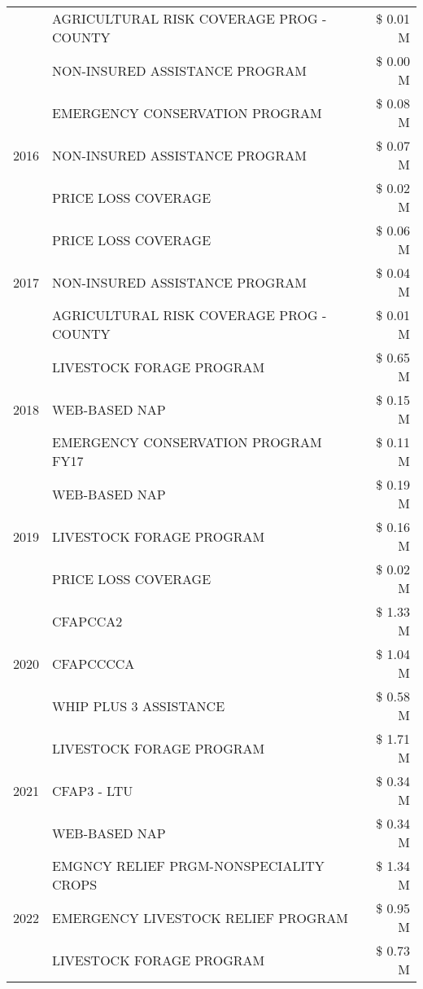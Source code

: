 \begin{tabular}{llr}
 & AGRICULTURAL RISK COVERAGE PROG - COUNTY & \$ 0.01 M \\
 & NON-INSURED ASSISTANCE PROGRAM & \$ 0.00 M \\
\cline{1-3}
\multirow[t]{3}{*}{2016} & EMERGENCY CONSERVATION PROGRAM & \$ 0.08 M \\
 & NON-INSURED ASSISTANCE PROGRAM & \$ 0.07 M \\
 & PRICE LOSS COVERAGE & \$ 0.02 M \\
\cline{1-3}
\multirow[t]{3}{*}{2017} & PRICE LOSS COVERAGE & \$ 0.06 M \\
 & NON-INSURED ASSISTANCE PROGRAM & \$ 0.04 M \\
 & AGRICULTURAL RISK COVERAGE PROG - COUNTY & \$ 0.01 M \\
\cline{1-3}
\multirow[t]{3}{*}{2018} & LIVESTOCK FORAGE PROGRAM & \$ 0.65 M \\
 & WEB-BASED NAP & \$ 0.15 M \\
 & EMERGENCY CONSERVATION PROGRAM FY17 & \$ 0.11 M \\
\cline{1-3}
\multirow[t]{3}{*}{2019} & WEB-BASED NAP & \$ 0.19 M \\
 & LIVESTOCK FORAGE PROGRAM & \$ 0.16 M \\
 & PRICE LOSS COVERAGE & \$ 0.02 M \\
\cline{1-3}
\multirow[t]{3}{*}{2020} & CFAPCCA2 & \$ 1.33 M \\
 & CFAPCCCCA & \$ 1.04 M \\
 & WHIP PLUS 3 ASSISTANCE & \$ 0.58 M \\
\cline{1-3}
\multirow[t]{3}{*}{2021} & LIVESTOCK FORAGE PROGRAM & \$ 1.71 M \\
 & CFAP3 - LTU & \$ 0.34 M \\
 & WEB-BASED NAP & \$ 0.34 M \\
\cline{1-3}
\multirow[t]{3}{*}{2022} & EMGNCY RELIEF PRGM-NONSPECIALITY CROPS & \$ 1.34 M \\
 & EMERGENCY LIVESTOCK RELIEF PROGRAM & \$ 0.95 M \\
 & LIVESTOCK FORAGE PROGRAM & \$ 0.73 M \\
\cline{1-3}
\bottomrule
\end{tabular}
